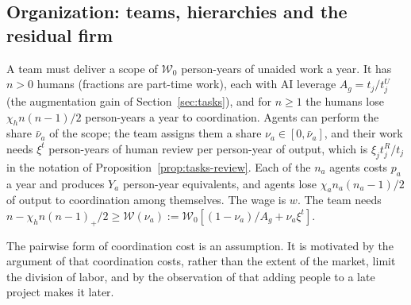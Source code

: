 

\subsection{Organization: teams, hierarchies and the residual firm}\label{sec:ext-org}

\begin{assumption}\label{ass:ext-team}
A team must deliver a scope of $\mathcal W_0$ person-years of unaided work a year. It has $n>0$ humans (fractions are part-time work), each with AI leverage $A_g=t_j/t^U_j$ (the augmentation gain of Section~\ref{sec:tasks}), and for $n\ge1$ the humans lose $\chi_hn(n-1)/2$ person-years a year to coordination. Agents can perform the share $\bar\nu_a$ of the scope; the team assigns them a share $\nu_a\in[0,\bar\nu_a]$, and their work needs $\xi^t$ person-years of human review per person-year of output, which is $\xi_jt^R_j/t_j$ in the notation of Proposition~\ref{prop:tasks-review}. Each of the $n_a$ agents costs $p_a$ a year and produces $Y_a$ person-year equivalents, and agents lose $\chi_an_a(n_a-1)/2$ of output to coordination among themselves. The wage is $w$. The team needs $n-\chi_hn(n-1)_+/2\ge \mathcal W(\nu_a):=\mathcal W_0[(1-\nu_a)/A_g+\nu_a\xi^t]$.
\end{assumption}

The pairwise form of coordination cost is an assumption. It is motivated by the argument of \citet{becker1992division} that coordination costs, rather than the extent of the market, limit the division of labor, and by the observation of \citet{brooks1975mythical} that adding people to a late project makes it later.

